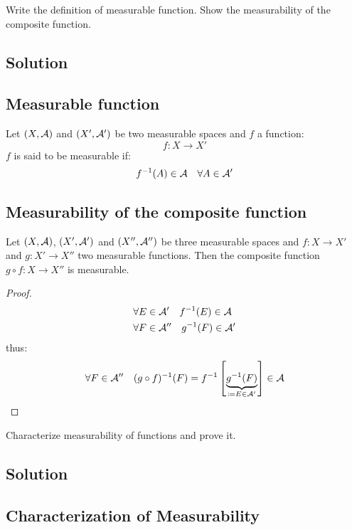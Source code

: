 \sheet


\question

Write the definition of measurable function. Show the measurability of the composite function.

\subsection*{Solution}

\subsection{Measurable function}

Let $(X,\mathcal{A})$ and $(X',\mathcal{A}')$ be two measurable spaces and $f$ a function:
\[
    f:X\to X'
\]
$f$ is said to be measurable if:
\[
    f^{-1}(A)\in\mathcal{A}\quad\forall A\in\mathcal{A}'
\]

\subsection{Measurability of the composite function} \label{meas:comp}
Let $(X,\mathcal{A})$, $(X',\mathcal{A}')$ and $(X'',\mathcal{A}'')$ be three measurable spaces and $f:X\to X'$ and $g:X'\to X''$ two measurable functions. Then the composite function $g\circ f:X\to X''$ is measurable.

\begin{proof}
    \begin{align*}
         & \forall E \in \mathcal{A}' \quad f^{-1}(E)\in\mathcal{A}   \\
         & \forall F \in \mathcal{A}'' \quad g^{-1}(F)\in\mathcal{A}' \\
    \end{align*}
    thus:
    \[
        \forall F\in \mathcal{A}'' \quad (g\circ f)^{-1}(F) = f^{-1} \left[ \underbrace{g^{-1}(F)}_{\coloneqq E \in \mathcal{A}'} \right] \in\mathcal{A}
    \]
\end{proof}


\question

Characterize measurability of functions and prove it.

\subsection*{Solution}

\subsection{Characterization of Measurability}\label{CharMeas}

